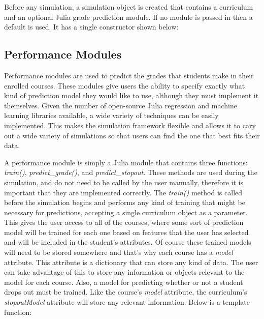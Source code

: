 \documentclass[botnum, fleqn]{unmeethesis}
\begin{document}
      Before any simulation, a simulation object is created that contains a curriculum and an optional Julia grade prediction module. If no module is passed in then a default is used. It has a single constructor shown below:

      

  
  \subsection{Performance Modules}
    Performance modules are used to predict the grades that students make in their enrolled courses. These modules give users the ability to specify exactly what kind of prediction model they would like to use, although they must implement it themselves. Given the number of open-source Julia regression and machine learning libraries available, a wide variety of techniques can be easily implemented. This makes the simulation framework flexible and allows it to cary out a wide variety of simulations so that users can find the one that best fits their data. 

    A performance module is simply a Julia module that contains three functions: \textit{train()}, \textit{predict\_grade()}, and \textit{predict\_stopout}. These methods are used during the simulation, and do not need to be called by the user manually, therefore it is important that they are implemented correctly. The \textit{train()} method is called before the simulation begins and performs any kind of training that might be necessary for predictions, accepting a single curriculum object as a parameter. This gives the user access to all of the courses, where some sort of prediction model will be trained for each one based on features that the user has selected and will be included in the student's attributes. Of course these trained models will need to be stored somewhere and that's why each course has a \textit{model} attribute. This attribute is a dictionary that can store any kind of data. The user can take advantage of this to store any information or objects relevant to the model for each course. Also, a model for predicting whether or not a student drops out must be trained. Like the course's \textit{model} attribute, the curriculum's \textit{stopoutModel} attribute will store any relevant information. Below is a template function:
\end{document}
